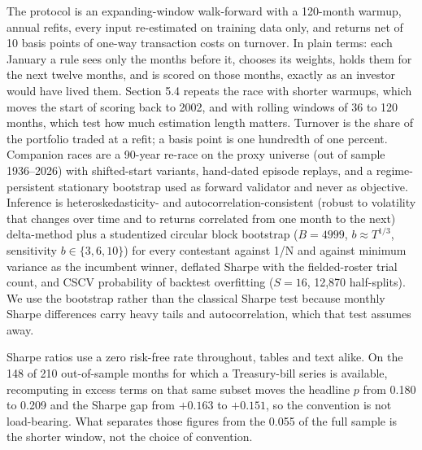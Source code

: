 \documentclass[12pt,letterpaper]{article}
\newcommand{\nuevo}[1]{{\color{nuevoc}#1}}
\newenvironment{quitado}{\par\color{quitarc}}{\par}
\begin{document}
The protocol is an expanding-window walk-forward with a 120-month warmup, annual
refits, every input re-estimated on training data only, and returns net of 10
basis points of one-way transaction costs on turnover.\nuevo{ In plain terms: each January a
rule sees only the months before it, chooses its weights, holds them for the next twelve
months, and is scored on those months, exactly as an investor would have lived them. Section 5.4
repeats the race with shorter warmups, which moves the start of scoring back to 2002, and with
rolling windows of 36 to 120 months, which test how much estimation length matters. Turnover is the
share of the portfolio traded at a refit; a basis point is one hundredth of one percent.} Companion races are a
90-year re-race on the proxy universe (out of sample 1936--2026) with
shifted-start variants, hand-dated episode replays, and a regime-persistent
stationary bootstrap used as forward validator and never as objective. Inference
is \citet{ledoit2008} heteroskedasticity- and autocorrelation-consistent\nuevo{ (robust to
volatility that changes over time and to returns correlated from one month to the next)}
delta-method plus a studentized circular block bootstrap ($B = 4999$,
$b \approx T^{1/3}$, sensitivity $b \in \{3,6,10\}$) for every contestant against 1/N and against minimum variance as the incumbent winner, deflated Sharpe with the fielded-roster
trial count, and CSCV probability of backtest overfitting ($S = 16$, 12,870
half-splits). We use the bootstrap rather than the classical Sharpe test because
monthly Sharpe differences carry heavy tails and autocorrelation, which that test
assumes away.

\begin{quitado}
Sharpe ratios use a zero risk-free rate throughout, tables and text alike. On the
148 of 210 out-of-sample months for which a Treasury-bill series is available,
recomputing in excess terms on that same subset moves the headline $p$ from 0.180
to 0.209 and the Sharpe gap from $+0.163$ to $+0.151$, so the convention is not
load-bearing. What separates those figures from the 0.055 of the full sample is
the shorter window, not the choice of convention.
\end{quitado}
\end{document}

